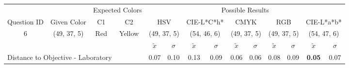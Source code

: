 \begin{table}[H]
  \resizebox{\textwidth}{!} {
  \begin{tabular}{lccccccccccccc}
    \hline
    \multicolumn{1}{c}{}                              &                                      & \multicolumn{2}{c}{Expected Colors}                   & \multicolumn{10}{c}{Possible Results}                                                                                                                                                                                                                                                                                        \\ \cline{3-14}
    \multicolumn{1}{c}{\multirow{-2}{*}{Question ID}} & \multirow{-2}{*}{Given Color}        & C1                       & C2                         & \multicolumn{2}{c}{HSV}                                        & \multicolumn{2}{c}{CIE-L*C*h*}                                 & \multicolumn{2}{c}{CMYK}                                       & \multicolumn{2}{c}{RGB}                                        & \multicolumn{2}{c}{CIE-L*a*b*}                                 \\ \hline
    \multicolumn{1}{c}{6}                             & \cellcolor[HTML]{FF8000}(49, 37, 5) & \multicolumn{1}{c|}{Red} & \multicolumn{1}{c|}{Yellow}  & \multicolumn{2}{c|}{\cellcolor[HTML]{FF8000}(49, 37, 5)}      & \multicolumn{2}{c|}{\cellcolor[HTML]{FF9F00}(54, 46, 6)}       & \multicolumn{2}{c|}{\cellcolor[HTML]{FF8000}(49, 37, 5)}       & \multicolumn{2}{c|}{\cellcolor[HTML]{FF8000}(49, 37, 5)}       & \multicolumn{2}{c|}{\cellcolor[HTML]{FFA100}(54, 47, 6)}       \\ \hline
                                                      & \multicolumn{1}{l}{}                 & \multicolumn{1}{l}{}     & \multicolumn{1}{l}{}       & \multicolumn{1}{c}{$\tilde{x}$} & \multicolumn{1}{c}{$\sigma$} & \multicolumn{1}{c}{$\tilde{x}$} & \multicolumn{1}{c}{$\sigma$} & \multicolumn{1}{c}{$\tilde{x}$} & \multicolumn{1}{c}{$\sigma$} & \multicolumn{1}{c}{$\tilde{x}$} & \multicolumn{1}{c}{$\sigma$} & \multicolumn{1}{c}{$\tilde{x}$} & \multicolumn{1}{c}{$\sigma$} \\ \hline
    \multicolumn{4}{l}{Distance to Objective - Laboratory}                                                                                           & \multicolumn{1}{|c}{0.07}       & \multicolumn{1}{c|}{0.10}    & \multicolumn{1}{|c}{0.13}       & \multicolumn{1}{c|}{0.09}    & \multicolumn{1}{|c}{0.06}       & \multicolumn{1}{c|}{0.06}    & \multicolumn{1}{|c}{0.08}       & \multicolumn{1}{c|}{0.09}    & \multicolumn{1}{|c}{\textbf{0.05}}       & \multicolumn{1}{c|}{0.07}    \\

\end{tabular}}
\end{table}

